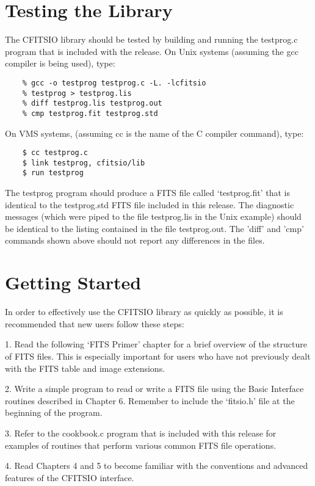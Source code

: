 \section{Testing the Library}

The CFITSIO library should be tested by building and running
the testprog.c program that is included with the release.
On Unix systems (assuming the gcc compiler is being used), type:

\begin{verbatim}
    % gcc -o testprog testprog.c -L. -lcfitsio
    % testprog > testprog.lis
    % diff testprog.lis testprog.out
    % cmp testprog.fit testprog.std
\end{verbatim}
 On VMS systems,
(assuming cc is the name of the C compiler command), type:

\begin{verbatim}
    $ cc testprog.c
    $ link testprog, cfitsio/lib
    $ run testprog
\end{verbatim}
The testprog program should produce a FITS file called `testprog.fit'
that is identical to the testprog.std FITS file included in this
release.  The diagnostic messages (which were piped to the file
testprog.lis in the Unix example) should be identical to the listing
contained in the file testprog.out.  The 'diff' and 'cmp' commands
shown above should not report any differences in the files.


\section{Getting Started}

In order to effectively use the CFITSIO library as quickly as possible,
it is recommended that new users follow these steps:

1.  Read the following `FITS Primer' chapter for a brief
overview of the structure of FITS files.  This is especially important
for users who have not previously dealt with the FITS table and image
extensions.

2.  Write a simple program to read or write a FITS file using the Basic
Interface routines described in Chapter 6.  Remember to include the
`fitsio.h' file at the beginning of the program.

3.  Refer to the cookbook.c program that is included with this release
for examples of routines that perform various common FITS file
operations.

4. Read Chapters 4 and 5 to become familiar with the conventions and
advanced features of the CFITSIO interface.

